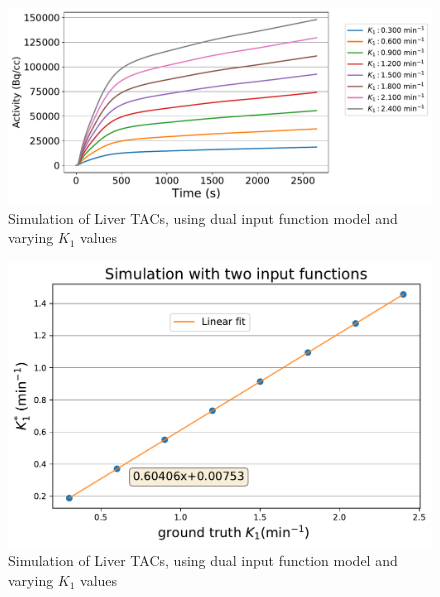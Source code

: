 %
\begin{figure}[h!]
\centering
\includegraphics[scale=0.48,angle=0]{appendices/figures/ApendixC_multiple_K1.pdf}
\caption{Simulation of Liver TACs, using dual input function model and varying $K_1$ values}
\label{fig_3_3:K1_Sims}
\end{figure} 
%
\begin{figure}[h!]
\centering
\includegraphics[scale=0.48,angle=0]{appendices/figures/ApendixC_multiple_K1_solution.pdf}
\caption{Simulation of Liver TACs, using dual input function model and varying $K_1$ values}
\label{fig_3_3:K1_Sims_Results}
\end{figure} 